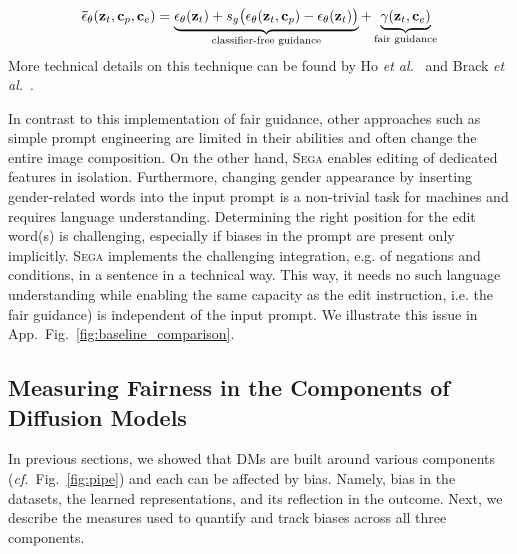 \documentclass{article}%
\newcommand{\cf}{\emph{cf.}~}
\newcommand{\etal}{\emph{et al.}~}
\begin{document}
\begin{equation}\label{eqn:fairguidance}
\mathbf{\Bar{\epsilon}}_\theta(\mathbf{z}_t, \mathbf{c}_p, \mathbf{c}_e)=        \underbrace{ \mathbf{\epsilon}_\theta(\mathbf{z}_t) + s_g \big(\mathbf{\epsilon}_\theta(\mathbf{z}_t, \mathbf{c}_p) - \mathbf{\epsilon}_\theta(\mathbf{z}_t)\big)}_{\text{classifier-free guidance}} + \underbrace{\gamma(\mathbf{z}_t, \mathbf{c}_e)}_{\text{fair guidance}}
\end{equation}
More technical details on this technique can be found by Ho \etal \cite{ho2022classifier} and Brack \etal \cite{brack2023Sega}.

In contrast to this implementation of fair guidance, other approaches such as simple prompt engineering are limited in their abilities \cite{bansal2022diversify} and often change the entire image composition. On the other hand, \textsc{Sega} enables editing of dedicated features in isolation. Furthermore, changing gender appearance by inserting gender-related words into the input prompt is a non-trivial task for machines and requires language understanding. Determining the right position for the edit word(s) is challenging, especially if biases in the prompt are present only implicitly. \textsc{Sega} implements the challenging integration, e.g. of negations and conditions, in a sentence in a technical way. This way, it needs no such language understanding while enabling the same capacity as the edit instruction, i.e. the fair guidance) is independent of the input prompt. We illustrate this issue in App.~Fig.~\ref{fig:baseline_comparison}.


\subsection*{Measuring Fairness in the Components of Diffusion Models}\label{sec:meth_inspect}
In previous sections, we showed that DMs are built around various components (\cf Fig.~\ref{fig:pipe}) and each can be affected by bias. Namely, bias in the datasets, the learned representations, and its reflection in the outcome. Next, we describe the measures used to quantify and track biases across all three components.
\end{document}
